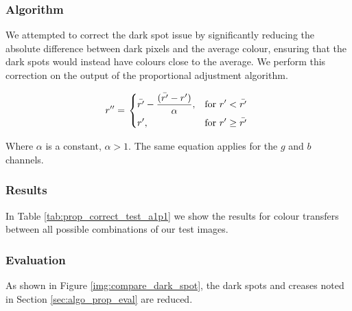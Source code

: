 \subsubsection*{Algorithm}
We attempted to correct the dark spot issue by significantly reducing the absolute difference between dark pixels and the average colour, ensuring that the dark spots would instead have colours close to the average. We perform this correction on the output of the proportional adjustment algorithm.

\begin{equation} \label{eq:prop_corr_algo}
  r'' = \left.
  \begin{dcases}
    \displaystyle \bar{r'} - \frac{(\bar{r'} - r')}{\alpha}, & \text{for } r' < \bar{r'} \\
    \displaystyle r', & \text{for } r' \geq \bar{r'} \\
  \end{dcases}
  \right.\\
\end{equation}


Where $\alpha$ is a constant, $\alpha  > 1$. The same equation applies for the $g$ and $b$ channels.

\subsubsection*{Results}

In Table \ref{tab:prop_correct_test_a1p1} we show the results for colour transfers between all possible combinations of our test images.


\subsubsection*{Evaluation}
As shown in Figure \ref{img:compare_dark_spot}, the dark spots and creases noted in Section \ref{sec:algo_prop_eval} are reduced.

